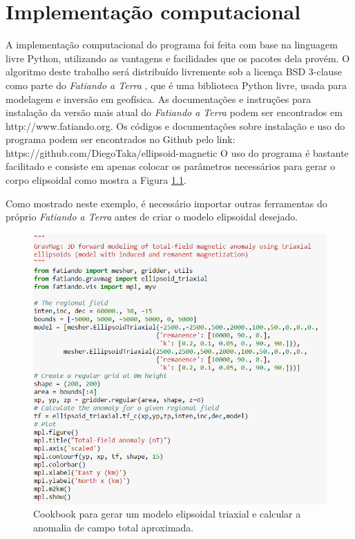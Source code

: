 \chapter{Implementação computacional}

A implementação computacional do programa foi feita com base na linguagem livre Python, utilizando as vantagens e facilidades que os pacotes dela provém.  
O algoritmo deste trabalho será distribuído livremente sob a licença BSD 3-clause como parte do \textit{Fatiando a Terra} \citet{uieda-proc-scipy-2013}, que é uma biblioteca Python livre, usada para modelagem e inversão em geofísica. As documentações e instruções para instalação da versão mais atual do \textit{Fatiando a Terra} podem ser encontrados em http://www.fatiando.org.
Os códigos e documentações sobre instalação e uso do programa podem ser encontrados no Github pelo link: https://github.com/DiegoTaka/ellipsoid-magnetic
O uso do programa é bastante facilitado e consiste em apenas colocar os parâmetros necessários para gerar o corpo elipsoidal como mostra a Figura \ref{fig:Cookbook_Triaxial}.

Como mostrado neste exemplo, é necessário importar outras ferramentas do próprio \textit{Fatiando a Terra} antes de criar o modelo elipsoidal desejado.

\begin{figure}[hbt!]
	\centering \includegraphics[width=16 cm,height=16 cm]{figures/Cookbook_Triaxial}
	\caption[Cookbook para gerar um modelo elipsoidal triaxial e calcular a anomalia de campo total.]{Cookbook para gerar um modelo elipsoidal triaxial e calcular a anomalia de campo total aproximada.}
	\label{fig:Cookbook_Triaxial}
\end{figure}

